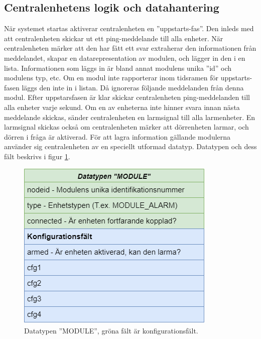 \subsection{Centralenhetens logik och datahantering}
\label{sec:centrallogik}
När systemet startas aktiverar centralenheten en ''uppstarts-fas''. Den inleds med att centralenheten skickar ut ett ping-meddelande till alla enheter. När centralenheten märker att den har fått ett svar extraherar den informationen från meddelandet, skapar en datarepresentation av modulen, och lägger in den i en lista. Informationen som läggs in är bland annat modulens unika ''id'' och modulens typ, etc. Om en modul inte rapporterar inom tidsramen för uppstarts-fasen läggs den inte in i listan. Då ignoreras följande meddelanden från denna modul.
\newline \newline
Efter uppstarsfasen är klar skickar centralenheten ping-meddelanden till alla enheter varje sekund. Om en av enheterna inte hinner svara innan nästa meddelande skickas, sänder centralenheten en larmsignal till alla larmenheter. En larmsignal skickas också om centralenheten märker att dörrenheten larmar, och dörren i fråga är aktiverad.
\newline \newline
För att lagra information gällande modulerna använder sig centralenheten av en speciellt utformad datatyp. Datatypen och dess fält beskrivs i figur \ref{fig:module}. 
\begin{figure}[h]
    \centering
    \includegraphics[scale=0.5]{dokumentation/projektrapport/IMAGES/diag_module.png}
    \caption{Datatypen ''MODULE'', gröna fält är konfigurationsfält.}
    \label{fig:module}
\end{figure}
\label{sec:centralenhetDL}
